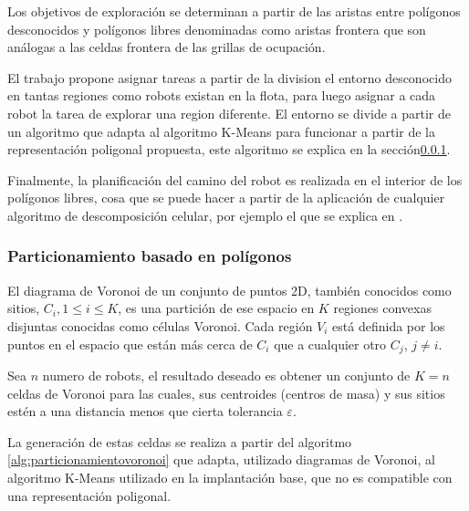 Los objetivos de exploración se determinan a partir de las aristas entre polígonos desconocidos y polígonos libres denominadas como aristas frontera que son análogas a las celdas frontera de las grillas de ocupación.

El trabajo propone asignar tareas a partir de la division el entorno desconocido en tantas regiones como robots existan en la flota, para luego asignar a cada robot la tarea de explorar una region diferente. El entorno se divide a partir de un algoritmo que adapta al algoritmo K-Means para funcionar a partir de la representación poligonal propuesta, este algoritmo se explica en la sección\ref{subsubsec:particionamientovoronoi}.


Finalmente, la planificación del camino del robot es realizada en el interior de los polígonos libres, cosa que se puede hacer a partir de la aplicación de cualquier algoritmo de descomposición celular, por ejemplo el que se explica en \cite{schachter1978decomposition}.
   
\subsubsection{Particionamiento basado en polígonos}\label{subsubsec:particionamientovoronoi}
El diagrama de Voronoi\cite{fortune1987sweepline} de un conjunto de puntos 2D, también conocidos como sitios, $C_{i} , 1 \leq i \leq K$, es una partición de ese espacio en $K$ regiones convexas disjuntas conocidas como células Voronoi. Cada región $V_i$ está definida por los puntos en el espacio que están más cerca de $C_{i}$ que a cualquier otro $C_{j}$, $j\neq i$. 

Sea $n$ numero de robots, el resultado deseado es obtener un conjunto de $K=n$ celdas de Voronoi para las cuales, sus centroides (centros de masa) y sus sitios estén a una distancia menos que cierta tolerancia $\varepsilon$. %

La generación de estas celdas se realiza a partir del algoritmo \ref{alg:particionamientovoronoi} que adapta, utilizado diagramas de Voronoi, al algoritmo K-Means utilizado en la implantación base, que no es compatible con una representación poligonal.

